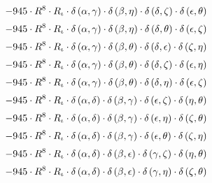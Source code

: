 \begin{subequations}
\begin{gather}
 \\[0.2em] \notag 		 - 945 \cdot R^{8} \cdot R_{\iota{}} \cdot \delta{}\left(\alpha{}, \gamma{}\right) \cdot \delta{}\left(\beta{}, \eta{}\right) \cdot \delta{}\left(\delta{}, \zeta{}\right) \cdot \delta{}\left(\epsilon{}, \theta{}\right) 
 \\[0.2em] \notag 		 - 945 \cdot R^{8} \cdot R_{\iota{}} \cdot \delta{}\left(\alpha{}, \gamma{}\right) \cdot \delta{}\left(\beta{}, \eta{}\right) \cdot \delta{}\left(\delta{}, \theta{}\right) \cdot \delta{}\left(\epsilon{}, \zeta{}\right) 
 \\[0.2em] \notag 		 - 945 \cdot R^{8} \cdot R_{\iota{}} \cdot \delta{}\left(\alpha{}, \gamma{}\right) \cdot \delta{}\left(\beta{}, \theta{}\right) \cdot \delta{}\left(\delta{}, \epsilon{}\right) \cdot \delta{}\left(\zeta{}, \eta{}\right) 
 \\[0.2em] \notag 		 - 945 \cdot R^{8} \cdot R_{\iota{}} \cdot \delta{}\left(\alpha{}, \gamma{}\right) \cdot \delta{}\left(\beta{}, \theta{}\right) \cdot \delta{}\left(\delta{}, \zeta{}\right) \cdot \delta{}\left(\epsilon{}, \eta{}\right) 
 \\[0.2em] \notag 		 - 945 \cdot R^{8} \cdot R_{\iota{}} \cdot \delta{}\left(\alpha{}, \gamma{}\right) \cdot \delta{}\left(\beta{}, \theta{}\right) \cdot \delta{}\left(\delta{}, \eta{}\right) \cdot \delta{}\left(\epsilon{}, \zeta{}\right) 
 \\[0.2em] \notag 		 - 945 \cdot R^{8} \cdot R_{\iota{}} \cdot \delta{}\left(\alpha{}, \delta{}\right) \cdot \delta{}\left(\beta{}, \gamma{}\right) \cdot \delta{}\left(\epsilon{}, \zeta{}\right) \cdot \delta{}\left(\eta{}, \theta{}\right) 
 \\[0.2em] \notag 		 - 945 \cdot R^{8} \cdot R_{\iota{}} \cdot \delta{}\left(\alpha{}, \delta{}\right) \cdot \delta{}\left(\beta{}, \gamma{}\right) \cdot \delta{}\left(\epsilon{}, \eta{}\right) \cdot \delta{}\left(\zeta{}, \theta{}\right) 
 \\[0.2em] \notag 		 - 945 \cdot R^{8} \cdot R_{\iota{}} \cdot \delta{}\left(\alpha{}, \delta{}\right) \cdot \delta{}\left(\beta{}, \gamma{}\right) \cdot \delta{}\left(\epsilon{}, \theta{}\right) \cdot \delta{}\left(\zeta{}, \eta{}\right) 
 \\[0.2em] \notag 		 - 945 \cdot R^{8} \cdot R_{\iota{}} \cdot \delta{}\left(\alpha{}, \delta{}\right) \cdot \delta{}\left(\beta{}, \epsilon{}\right) \cdot \delta{}\left(\gamma{}, \zeta{}\right) \cdot \delta{}\left(\eta{}, \theta{}\right) 
 \\[0.2em] \notag 		 - 945 \cdot R^{8} \cdot R_{\iota{}} \cdot \delta{}\left(\alpha{}, \delta{}\right) \cdot \delta{}\left(\beta{}, \epsilon{}\right) \cdot \delta{}\left(\gamma{}, \eta{}\right) \cdot \delta{}\left(\zeta{}, \theta{}\right) 

\end{gather}
\end{subequations}
